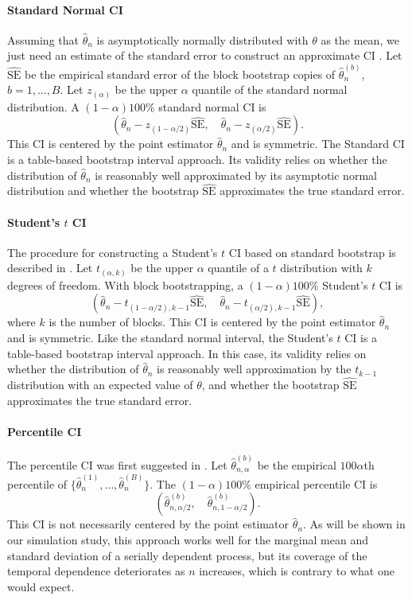\documentclass[12pt, letterpaper, titlepage]{article}
\newcommand{\eds}[1]{\textcolor{red}{EDS: (#1)}}
\newcommand{\mc}[1]{\textcolor{green}{MC: (#1)}}
\begin{document}
\paragraph{Standard Normal CI}
Assuming that $\hat\theta_n$ is asymptotically normally distributed with
$\theta$ as the mean, we just need an estimate of the standard error to
construct an approximate CI \citep[p.168]{efron1993introduction}. Let
$\widehat{\text{SE}}$ be the empirical standard error of the block bootstrap
copies of $\hat\theta_n^{(b)}$, $b = 1, \ldots, B$. Let $z_{(\alpha)}$ be the
upper $\alpha$ quantile of the standard normal distribution. A
$(1 - \alpha)100\%$ standard normal CI is
\[
(\hat{\theta}_{n} - z_{(1-\alpha/2)}\widehat{\text{SE}}, \quad
\hat{\theta}_{n} - z_{(\alpha/2)}\widehat{\text{SE}}).
\]
This CI is centered by the point estimator $\hat\theta_n$ and is symmetric. The
Standard CI is a table-based bootstrap interval approach. Its validity relies
on whether the distribution of $\hat\theta_n$ is reasonably well approximated
by its asymptotic normal distribution and whether the bootstrap
$\widehat{\text{SE}}$ approximates the true standard error.


\paragraph{Student's $t$ CI}
The procedure for constructing a Student's $t$ CI based on standard bootstrap
is described in \citet[p.158]{efron1993introduction}. Let $t_{(\alpha, k)}$ be
the upper $\alpha$ quantile of a $t$ distribution with $k$ degrees of freedom.
With block bootstrapping, a $(1 - \alpha)100\%$ Student's $t$ CI is
\[
(\hat{\theta}_{n} - t_{(1-\alpha/2), k - 1}\hat{\text{SE}}, \quad
\hat{\theta}_{n} - t_{(\alpha/2), k -1}\hat{\text{SE}}),
\]
where $k$ is the number of blocks. This CI is centered by the point estimator
$\hat\theta_n$ and is symmetric. Like the standard normal interval, the
Student's $t$ CI is a table-based bootstrap interval approach. In this case,
its validity relies on whether the distribution of $\hat\theta_n$ is
reasonably well approximation by the $t_{k-1}$ distribution with an expected
value of $\theta$, and whether the bootstrap $\widehat{\text{SE}}$
approximates the true standard error.


\paragraph{Percentile CI}
The percentile CI was first suggested in \citet{efron1979bootstrap}.
Let $\hat\theta_{n, \alpha}^{(b)}$ be the empirical $100\alpha$th percentile of
$\{\hat\theta_n^{(1)}, \ldots, \hat\theta_n^{(B)}\}$. The $(1 - \alpha)100\%$
empirical percentile CI is
\[
(\hat\theta_{n, \alpha/2}^{(b)}, \quad \hat\theta_{n, 1 - \alpha/2}^{(b)}).
\]
This CI is not necessarily centered by the point estimator $\hat\theta_n$. As
will be shown in our simulation study, this approach works well for the
marginal mean and standard deviation of a serially dependent process, but its
coverage of the temporal dependence deteriorates as $n$ increases, which is
contrary to what one would expect.
\end{document}

